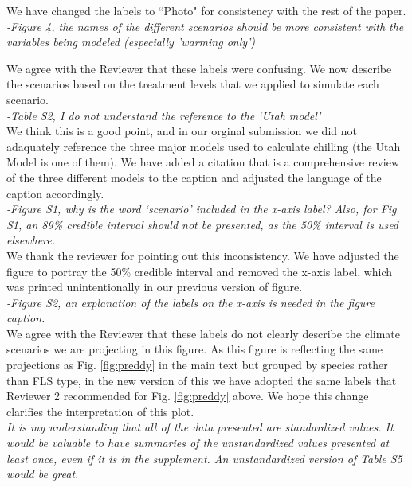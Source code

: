 \documentclass[11pt]{article}
\begin{document}
\noindent We have changed the labels to ``Photo" for consistency with the rest of the paper.\\

\emph{-Figure 4, the names of the different scenarios should be more consistent with the variables being modeled (especially 'warming only')}

\noindent We agree with the Reviewer that these labels were confusing. We now describe the scenarios based on the treatment levels that we applied to simulate each scenario.\\

\emph{-Table S2, I do not understand the reference to the `Utah model'}\\

\noindent We think this is a good point, and in our orginal submission we did not adaquately reference the three major models used to calculate chilling (the Utah Model is one of them). We have added a citation that is a comprehensive review of the three different models to the caption and adjusted the language of the caption accordingly.\\

\emph{-Figure S1, why is the word `scenario' included in the x-axis label? Also, for Fig S1, an 89\% credible interval should not be presented, as the 50\% interval is used elsewhere.}\\

\noident We thank the reviewer for pointing out this inconsistency. We have adjusted the figure to portray the 50\% credible interval and removed the x-axis label, which was printed unintentionally in our previous version of figure.\\

\emph{-Figure S2, an explanation of the labels on the x-axis is needed in the figure caption.}\\

\noindent We agree with the Reviewer that these labels do not clearly describe the climate scenarios we are projecting in this figure. As this figure is reflecting the same projections as Fig. \ref{fig:preddy} in the main text but grouped by species rather than FLS type, in the new version of this we have adopted the same labels that Reviewer 2 recommended for Fig. \ref{fig:preddy} above. We hope this change clarifies the interpretation of this plot.\\


\emph{It is my understanding that all of the data presented are standardized values. It would be valuable to have summaries of the unstandardized values presented at least once, even if it is in the supplement. An unstandardized version of Table S5 would be great.}\\
\end{document}
